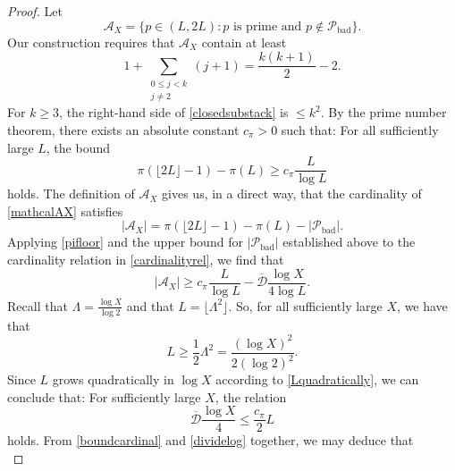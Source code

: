 \documentclass[12pt]{article}
\begin{document}
\begin{proof}
 Let 
\begin{equation}\label{mathcalAX}
 \mathcal{A}_{X} = \{ p \in (L, 2L) : \text{$p$ is prime and $p \not\in \mathcal{P}_{\operatorname{bad}}$} \}.
\end{equation}
 Our construction requires that $\mathcal{A}_{X}$ contain at least
\begin{equation}\label{closedsubstack} 
 1 + \sum_{\substack{ 0 \leq j < k \\ j \neq 2 }} (j+1)
 = \frac{k(k+1)}{2} - 2. 
\end{equation}
 For $k \geq 3$, the right-hand side of 
 \eqref{closedsubstack} is $\leq k^2$. 
 By the prime number theorem, there exists an absolute constant $c_{\pi} > 0$ such that:
 For all sufficiently large $L$, the bound
\begin{equation}\label{pifloor}
 \pi\left( \lfloor 2L \rfloor - 1 \right) - \pi(L) \geq c_{\pi} \frac{L}{\log L} 
\end{equation}
 holds. The definition of $\mathcal{A}_{X}$ 
 gives us, in a direct way, that the cardinality of \eqref{mathcalAX} satisfies 
\begin{equation}\label{cardinalityrel} 
 \left| \mathcal{A}_{X} \right| = 
 \pi\left( \lfloor 2L \rfloor - 1 \right) - \pi(L) - \left| \mathcal{P}_{\operatorname{bad}} \right|. 
\end{equation}
 Applying \eqref{pifloor} and the upper bound for $| \mathcal{P}_{\operatorname{bad}} |$ established
 above to the cardinality relation in \eqref{cardinalityrel}, we find that 
\begin{equation}\label{boundcardinal} 
 \left| \mathcal{A}_{X} \right| \geq c_{\pi} \frac{L}{\log L} - \overline{\mathcal{D}} \frac{\log X}{4 \log L}. 
\end{equation}
 Recall that $\Lambda = \frac{\log X}{\log 2}$ and that $L = \lfloor \Lambda^{2} \rfloor$. 
 So, for all sufficiently large $X$, we have that 
\begin{equation}\label{Lquadratically} 
 L \geq \frac{1}{2} \Lambda^{2} = \frac{ (\log X)^{2} }{2 (\log 2)^2}. 
\end{equation}
 Since $L$ grows quadratically in $\log X$ according to \eqref{Lquadratically}, we can conclude
 that: For sufficiently large $X$, the relation 
\begin{equation}\label{dividelog} 
 \overline{\mathcal{D}} \frac{\log X}{4} \leq \frac{c_{\pi}}{2} L 
\end{equation}
 holds. From \eqref{boundcardinal} and \eqref{dividelog} together, we may deduce that 
\begin{equation}\label{boundAlikepi}

\end{equation}
\end{proof}
\end{document}
